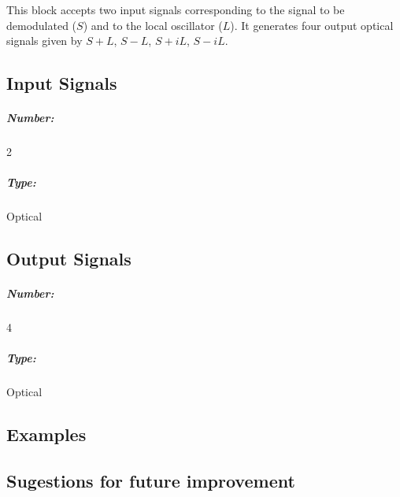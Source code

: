 \documentclass[a4paper]{article}
\begin{document}
This block accepts two  input signals corresponding to the signal to be demodulated ($S$) and to the local oscillator ($L$). It generates four output optical signals given by $S+L$, $S-L$, $S+iL$, $S-iL$.

\pagebreak

\subsection*{Input Signals}

\subparagraph*{Number:} 2

\subparagraph*{Type:} Optical 

\subsection*{Output Signals}

\subparagraph*{Number:} 4

\subparagraph*{Type:} Optical 

\subsection*{Examples} 

\subsection*{Sugestions for future improvement}
\end{document}
